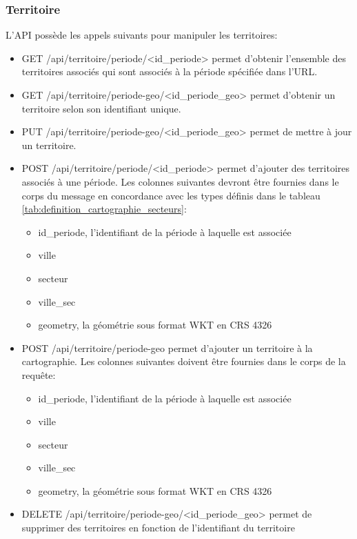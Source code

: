 \subsubsection{Territoire}
L'\ac{API} possède les appels suivants pour manipuler les territoires:
\begin{itemize}
    \item GET /api/territoire/periode/<id\_periode> permet d'obtenir l'ensemble des territoires associés qui sont associés à la période spécifiée dans l'\ac{URL}.
    \item GET /api/territoire/periode-geo/<id\_periode\_geo> permet d'obtenir un territoire selon son identifiant unique.
    \item PUT /api/territoire/periode-geo/<id\_periode\_geo> permet de mettre à jour un territoire.
    \item POST /api/territoire/periode/<id\_periode> permet d'ajouter des territoires associés à une période. Les colonnes suivantes devront être fournies dans le corps du message en concordance avec les types définis dans le tableau \ref{tab:definition_cartographie_secteurs}:
    \begin{itemize}
        \item id\_periode, l'identifiant de la période à laquelle est associée 
        \item ville
        \item secteur
        \item ville\_sec
        \item geometry, la géométrie sous format WKT en CRS 4326
    \end{itemize}
    \item POST /api/territoire/periode-geo permet d'ajouter un territoire à la cartographie. Les colonnes suivantes doivent être fournies dans le corps de la requête:
    \begin{itemize}
        \item id\_periode, l'identifiant de la période à laquelle est associée 
        \item ville
        \item secteur
        \item ville\_sec
        \item geometry, la géométrie sous format WKT en CRS 4326
    \end{itemize}
    \item DELETE /api/territoire/periode-geo/<id\_periode\_geo> permet de supprimer des territoires en fonction de l'identifiant du territoire
\end{itemize}
\clearpage

